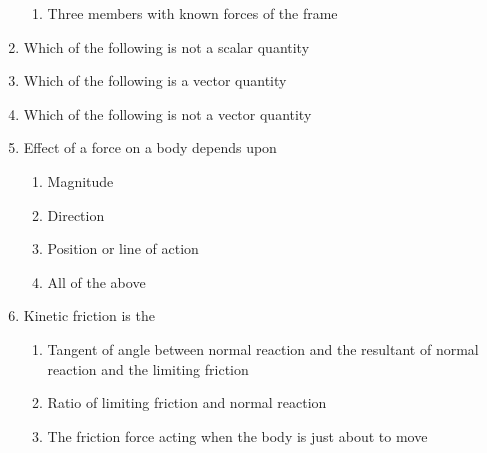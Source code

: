 \documentclass[11pt,a4paper]{article}
\begin{document}
\begin{enumerate}
\begin{enumerate}[label=\Alph*.]
\item{Three members with known forces of the frame}
\end{enumerate}
\item{Which of the following is not a scalar quantity}
\\
\item{Which of the following is a vector quantity}
\\
\item{Which of the following is not a vector quantity}
\\
\item{Effect of a force on a body depends upon}
\begin{enumerate}[label=\Alph*.]
\item{Magnitude}
\item{Direction}
\item{Position or line of action}
\item{All of the above}
\end{enumerate}
\item{Kinetic friction is the}
\begin{enumerate}[label=\Alph*.]
\item{Tangent of angle between normal reaction and the resultant of normal reaction and the limiting friction}
\item{Ratio of limiting friction and normal reaction}
\item{The friction force acting when the body is just about to move}

\end{enumerate}
\end{enumerate}
\end{document}
